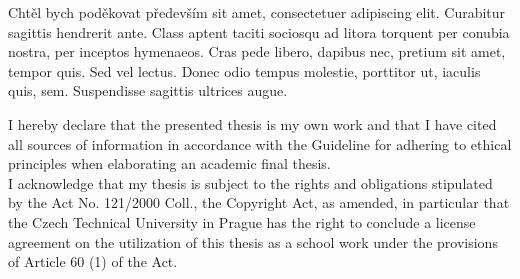 \documentclass[english,bachelor,unicode]{ctufit-thesis}
\theoremstyle{plain}
\theoremstyle{definition}
\theoremstyle{remark}
\numberwithin{theorem}{chapter}
\begin{document}
 
	\frontmatter\frontmatterinit
	
	
	\thispagestyle{empty}\cleardoublepage\maketitle
	
	\imprintpage
	
	\tableofcontents

	\listoffigures
	
	\begin{acknowledgmentpage} %
		Chtěl bych poděkovat především sit amet, consectetuer adipiscing elit. Curabitur sagittis hendrerit ante. Class aptent taciti sociosqu ad litora torquent per conubia nostra, per inceptos hymenaeos. Cras pede libero, dapibus nec, pretium sit amet, tempor quis. Sed vel lectus. Donec odio tempus molestie, porttitor ut, iaculis quis, sem. Suspendisse sagittis ultrices augue.
	\end{acknowledgmentpage}
	
	\begin{declarationpage}
		I hereby declare that the presented thesis is my own work and that I have cited all sources of information in accordance with the Guideline for adhering to ethical principles when elaborating an academic final thesis.\\
		
		I acknowledge that my thesis is subject to the rights and obligations stipulated by the Act No. 121/2000 Coll., the Copyright Act, as amended, in particular that the Czech Technical University in Prague has the right to conclude a license agreement on the utilization of this thesis as a school work under the provisions of Article 60 (1) of the Act.
	\end{declarationpage}
	
\end{document}
